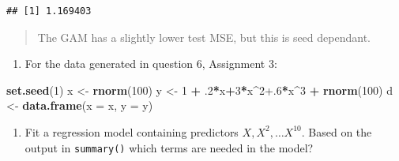 \documentclass[]{article}
\newenvironment{Shaded}{\begin{snugshade}}{\end{snugshade}}
\newcommand{\DataTypeTok}[1]{\textcolor[rgb]{0.13,0.29,0.53}{#1}}
\newcommand{\DecValTok}[1]{\textcolor[rgb]{0.00,0.00,0.81}{#1}}
\newcommand{\FloatTok}[1]{\textcolor[rgb]{0.00,0.00,0.81}{#1}}
\newcommand{\KeywordTok}[1]{\textcolor[rgb]{0.13,0.29,0.53}{\textbf{#1}}}
\newcommand{\NormalTok}[1]{#1}
\newcommand{\OperatorTok}[1]{\textcolor[rgb]{0.81,0.36,0.00}{\textbf{#1}}}
\newcommand{\OtherTok}[1]{\textcolor[rgb]{0.56,0.35,0.01}{#1}}
\newcommand{\StringTok}[1]{\textcolor[rgb]{0.31,0.60,0.02}{#1}}
\providecommand{\tightlist}{%
  \setlength{\itemsep}{0pt}\setlength{\parskip}{0pt}}
\begin{document}
\begin{verbatim}
## [1] 1.169403
\end{verbatim}

\begin{quote}
The GAM has a slightly lower test MSE, but this is seed dependant.
\end{quote}

\begin{enumerate}
\def\labelenumi{\arabic{enumi}.}
\setcounter{enumi}{4}
\tightlist
\item
  For the data generated in question 6, Assignment 3:
\end{enumerate}

\begin{Shaded}
\begin{Highlighting}[]
\KeywordTok{set.seed}\NormalTok{(}\DecValTok{1}\NormalTok{)}
\NormalTok{x <-}\StringTok{ }\KeywordTok{rnorm}\NormalTok{(}\DecValTok{100}\NormalTok{)}
\NormalTok{y <-}\StringTok{ }\DecValTok{1} \OperatorTok{+}\StringTok{ }\FloatTok{.2}\OperatorTok{*}\NormalTok{x}\OperatorTok{+}\DecValTok{3}\OperatorTok{*}\NormalTok{x}\OperatorTok{^}\DecValTok{2}\FloatTok{+.6}\OperatorTok{*}\NormalTok{x}\OperatorTok{^}\DecValTok{3} \OperatorTok{+}\StringTok{ }\KeywordTok{rnorm}\NormalTok{(}\DecValTok{100}\NormalTok{)}
\NormalTok{d <-}\StringTok{ }\KeywordTok{data.frame}\NormalTok{(}\DataTypeTok{x =}\NormalTok{ x, }\DataTypeTok{y =}\NormalTok{ y)}
\end{Highlighting}
\end{Shaded}

\begin{enumerate}
\def\labelenumi{(\alph{enumi})}
\tightlist
\item
  Fit a regression model containing predictors \(X, X^2, \dots X^10\).
  Based on the output in \texttt{summary()} which terms are needed in
  the model?
\end{enumerate}

\begin{Shaded}
\end{Shaded}
\end{document}
